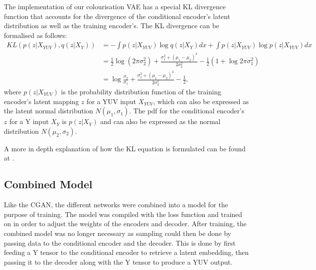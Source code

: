 \documentclass{l4proj}
\begin{document}
The implementation of our colourisation VAE has a special KL divergence function that accounts for the divergence of the conditional encoder's latent distribution as well as the training encoder's. The KL divergence can be formalised as follows:
\begin{equation}
\begin{split}
    KL\left(p(z|X_{YUV}),q(z|X_{Y})\right) 
            & = - \int p(z|X_{YUV}) \log q(z|X_{Y}) dx + \int p(z|X_{YUV}) \log p(z|X_{YUV}) dx \\
            & = \frac{1}{2} \log (2 \pi \sigma_{2}^{2}) + \frac{\sigma_{1}^{2}+(\mu_{1}-\mu_{2})^2}{2\sigma_{2}^{2}}-\frac{1}{2}(1+\log{2\pi\sigma_{1}^{2}}) \\
            & = \log\frac{\sigma_{2}}{\sigma_{1}}+\frac{\sigma_{1}^{2}+(\mu_{1}-\mu_{2})^{2}}{2\sigma_{2}^{2}}-\frac{1}{2},
\end{split}
\end{equation}
where $p(z|X_{YUV})$ is the probability distribution function of the training encoder's latent mapping $z$ for a YUV input $X_{YUV}$, which can also be expressed as the latent normal distribution $N(\mu_{1},\sigma_{1})$. The pdf for the conditional encoder's $z$ for a Y input $X_{Y}$ is $p(z|X_{Y})$ and can also be expressed as the normal distribution $N(\mu_{2},\sigma_{2})$.

A more in depth explanation of how the KL equation is formulated can be found at \cite{KL}.

\subsection{Combined Model}
Like the CGAN, the different networks were combined into a model for the purpose of training. The model was compiled with the loss function and trained on in order to adjust the weights of the encoders and decoder. After training, the combined model was no longer necessary as sampling could then be done by passing data to the conditional encoder and the decoder. This is done by first feeding a Y tensor to the conditional encoder to retrieve a latent embedding, then passing it to the decoder along with the Y tensor to produce a YUV output.
\end{document}
